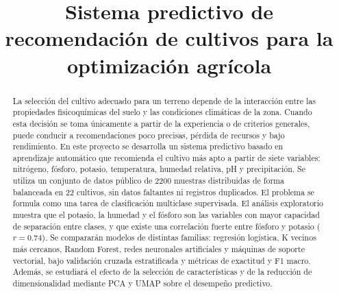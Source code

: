 \documentclass[conference]{IEEEtran}
\begin{document}
\title{Sistema predictivo de recomendación de cultivos para la optimización agrícola}

\author{
\and
{}
\and
{}
}

\maketitle


\begin{abstract}
La selección del cultivo adecuado para un terreno depende de la interacción entre las propiedades fisicoquímicas del suelo y las condiciones climáticas de la zona. Cuando esta decisión se toma únicamente a partir de la experiencia o de criterios generales, puede conducir a recomendaciones poco precisas, pérdida de recursos y bajo rendimiento. En este proyecto se desarrolla un sistema predictivo basado en aprendizaje automático que recomienda el cultivo más apto a partir de siete variables: nitrógeno, fósforo, potasio, temperatura, humedad relativa, pH y precipitación. Se utiliza un conjunto de datos público de 2200 muestras distribuidas de forma balanceada en 22 cultivos, sin datos faltantes ni registros duplicados. El problema se formula como una tarea de clasificación multiclase supervisada. El análisis exploratorio muestra que el potasio, la humedad y el fósforo son las variables con mayor capacidad de separación entre clases, y que existe una correlación fuerte entre fósforo y potasio ($r=0.74$). Se compararán modelos de distintas familias: regresión logística, K vecinos más cercanos, Random Forest, redes neuronales artificiales y máquinas de soporte vectorial, bajo validación cruzada estratificada y métricas de exactitud y F1 macro. Además, se estudiará el efecto de la selección de características y de la reducción de dimensionalidad mediante PCA y UMAP sobre el desempeño predictivo.
\end{abstract}
\end{document}
